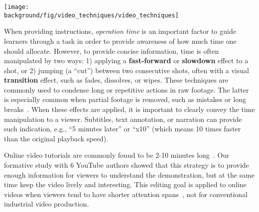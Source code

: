 \begin{figure*}[h!]
  \centering
  \texttt{[image: \\background/fig/video\_techniques/video\_techniques]}
  \begin{minipage}{\textwidth}
  \caption[Example video editing techniques used in a video tutorial.]{
    Example video editing techniques used in a video tutorial\footnote{``How to use Loola 3 stroller'' by Maxi-Cosi, \url{https://youtu.be/p6MzLXeWBJw}, licensed under CC BY 2.0}:
    (a) a sequence of overview and detailed shots, and
    (b) a title scene to introduce a new section, which can include animation or movement as a preview.
  }
  \label{fig:background_video_techniques}
  \end{minipage}
\end{figure*}


When providing instructions, \emph{operation time} is an important factor to guide learners through a task in order to provide awareness of how much time one should allocate.
%
However, to provide concise information, time is often manipulated by two ways: 1) applying a \textbf{fast-forward} or \textbf{slowdown} effect to a shot, or 2) jumping (a ``cut'') between two consecutive shots, often with a visual \textbf{transition} effect, such as fades, dissolves, or wipes. These techniques are commonly used to condense long or repetitive actions in raw footage. The latter is especially common when partial footage is removed, such as mistakes or long breaks~\cite{Tseng:2014:PVP:2598510.2598540}.
%
When these effects are applied, it is important to clearly convey the time manipulation to a viewer. Subtitles, text annotation, or narration can provide such indication, e.g., ``5 minutes later'' or ``x10'' (which means 10 times faster than the original playback speed).




Online video tutorials are commonly found to be 2-10 minutes long~\cite{Chi:2013:DGC:2501988.2502052}. Our formative study with 6 YouTube authors showed that this strategy is to provide enough information for viewers to understand the demonstration, but at the same time keep the video lively and interesting. This editing goal is applied to online videos when viewers tend to have shorter attention spans~\cite{YouTubeVideoLength2016,YouTubeVideoLength2012}, not for conventional industrial video production.

